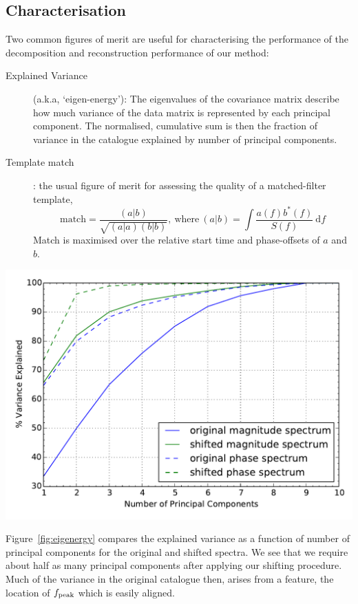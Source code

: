 \documentclass[a0,landscape]{a0poster}
\newcommand{\diff}{{\mathrm d}}
\begin{document}
\begin{multicols}{4}
\section*{\centering Characterisation}
Two common figures of merit are useful for characterising the performance of the
decomposition and reconstruction performance of our method:
\begin{description}
    \item [Explained Variance] (a.k.a, `eigen-energy'): The eigenvalues of the
        covariance matrix describe how much variance of the data matrix is
        represented by each principal component.  The normalised, cumulative sum
        is then the fraction of variance in the catalogue explained by number of
        principal components.
    \item [Template match]: the usual figure of merit for assessing the quality
        of a matched-filter template,
        \begin{equation}
            \text{match} = \frac{(a|b)}{\sqrt{(a|a) (b|b)}},~\text{where}~
            (a|b) = \int \frac{a(f)b^*(f)}{S(f)}~\diff f
        \end{equation}
        Match is maximised over the relative start time and phase-offsets of $a$
        and $b$.
\end{description}

%
%
\begin{center}%
    \includegraphics[width=0.5\linewidth]{eigenergy.pdf}
    \label{fig:eigenergy}
\end{center}%

Figure~\ref{fig:eigenergy} compares the explained variance as a function of
number of principal components for the original and shifted spectra.  We see
that we require about half as many principal components after applying our
shifting procedure.   Much of the variance in the original catalogue then,
arises from a feature, the location of $f_{\rm peak}$ which is easily aligned.



\end{multicols}
\end{document}
